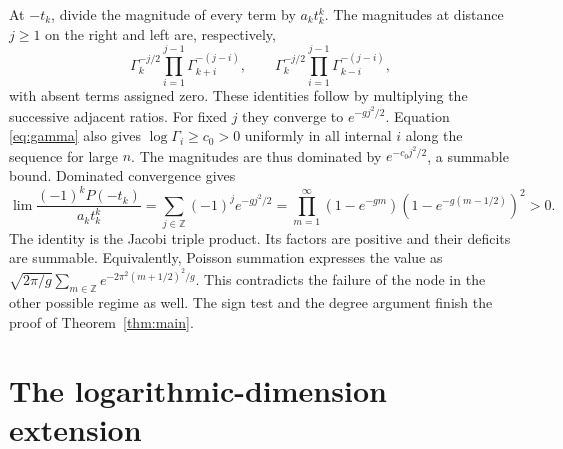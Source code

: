 \documentclass[11pt]{article}
\begin{document}
At $-t_k$, divide the magnitude of every term by $a_kt_k^k$.
The magnitudes at distance $j\ge1$ on the right and left are,
respectively,
\[
\Gamma_k^{-j/2}\prod_{i=1}^{j-1}\Gamma_{k+i}^{-(j-i)},
\qquad
\Gamma_k^{-j/2}\prod_{i=1}^{j-1}\Gamma_{k-i}^{-(j-i)},
\]
with absent terms assigned zero. These identities follow by
multiplying the successive adjacent ratios. For fixed $j$ they
converge to $e^{-g j^2/2}$. Equation \eqref{eq:gamma} also gives
$\log\Gamma_i\ge c_0>0$ uniformly in all internal $i$ along the
sequence for large $n$. The magnitudes are thus dominated by
$e^{-c_0j^2/2}$, a summable bound. Dominated convergence gives
\[
\lim\frac{(-1)^kP(-t_k)}{a_kt_k^k}
=\sum_{j\in\mathbb Z}(-1)^j e^{-g j^2/2}
=\prod_{m=1}^{\infty}(1-e^{-gm})
                        (1-e^{-g(m-1/2)})^2>0.
\]
The identity is the Jacobi triple product. Its factors are positive
and their deficits are summable. Equivalently, Poisson summation
expresses the value as
$\sqrt{2\pi/g}\sum_{m\in\mathbb Z}e^{-2\pi^2(m+1/2)^2/g}$.
This contradicts the failure of the node in the other possible
regime as well. The sign test and the degree argument finish the
proof of Theorem~\ref{thm:main}.

\part{The logarithmic-dimension extension}\label{part:logarithmic}



\appendix



\end{document}
